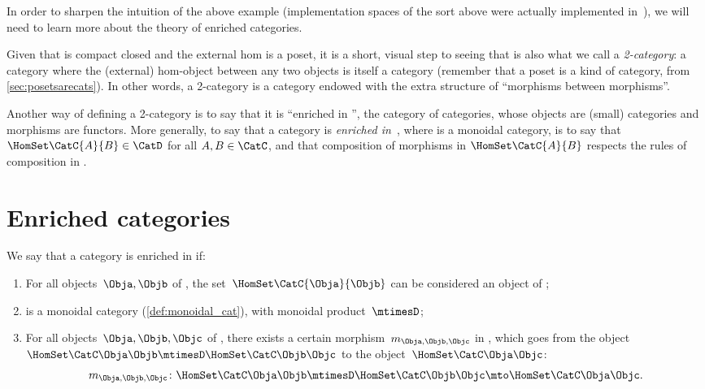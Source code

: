 In order to sharpen the intuition of the above example (implementation spaces of the sort above were actually implemented in~\cite{censi}), we will need to learn more about the theory of enriched categories.

Given that \DP is compact closed and the external hom is a poset, it is a short, visual step to seeing that \DP is also what we call a \emph{2-category}: a category where the (external) hom-object between any two objects is itself a category (remember that a poset is a kind of category, from \cref{sec:posetsarecats}). In other words, a 2-category is a category endowed with the extra structure of ``morphisms between morphisms''.

Another way of defining a 2-category is to say that it is ``enriched in \Category'', the category of categories, whose objects are (small) categories and morphisms are functors. More generally, to say that a category \CatC is \emph{enriched in~\CatD}, where \CatD is a monoidal category, is to say that $\HomSet\CatC{A}{B} \in \CatD$ for all $A,B \in \CatC$, and that composition of morphisms in $\HomSet\CatC{A}{B}$ respects the rules of composition in \CatD.


\section{Enriched categories}\label{sec:enrichment-enriched-categories}

\begin{ctdefinition}
  \label{def:enriched-category}
  We say that a category \CatC is enriched in \CatD if:
  \begin{enumerate}
    \item For all objects~$\Obja, \Objb$ of \CatC, the set~$\HomSet\CatC{\Obja}{\Objb}$ can be considered an object of \CatD;
    \item \CatD is a monoidal category (\cref{def:monoidal_cat}),
    with monoidal product~$\mtimesD$;
    \item For all objects~$\Obja, \Objb, \Objc$ of \CatC, there exists
    a certain morphism~$m_{\Obja, \Objb, \Objc}$ in \CatD,
    which goes from the object~$\HomSet\CatC\Obja\Objb \mtimesD \HomSet\CatC\Objb\Objc$ to the object~$ \HomSet\CatC\Obja\Objc$:
    \begin{equation}
      \label{eq:enriched-condition}
      m_{\Obja, \Objb, \Objc} \colon \HomSet\CatC\Obja\Objb \mtimesD \HomSet\CatC\Objb\Objc \mto \HomSet\CatC\Obja\Objc.
    \end{equation}
  \end{enumerate}
\end{ctdefinition}

